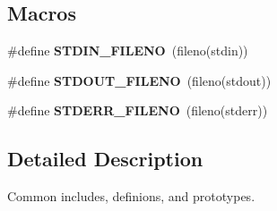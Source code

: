 \subsection*{Macros}
\begin{DoxyCompactItemize}
\item 
\#define {\bfseries S\-T\-D\-I\-N\-\_\-\-F\-I\-L\-E\-N\-O}~(fileno(stdin))\label{private_8h_afcf80a6d91178952d107ad00b165752b}

\item 
\#define {\bfseries S\-T\-D\-O\-U\-T\-\_\-\-F\-I\-L\-E\-N\-O}~(fileno(stdout))\label{private_8h_abd165ee6474b5b75bf075842fff13a04}

\item 
\#define {\bfseries S\-T\-D\-E\-R\-R\-\_\-\-F\-I\-L\-E\-N\-O}~(fileno(stderr))\label{private_8h_ae2fe1725bb5e9823d089c46b9ed5266e}

\end{DoxyCompactItemize}


\subsection{Detailed Description}
Common includes, definions, and prototypes. 